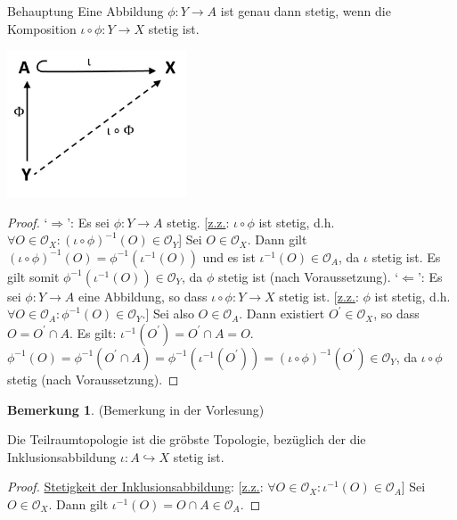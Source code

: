 \documentclass[a4paper,11pt,notitlepage]{report}
\theoremstyle{definition}
\newtheorem{remark}{Bemerkung}[chapter]
\newcommand{\OO}{{\ensuremath{\mathcal{O}}}}
\begin{document}
\begin{theorem}{Behauptung}
Eine Abbildung $\phi \colon Y \rightarrow A$ ist genau dann stetig, wenn die Komposition $\iota \circ \phi \colon Y \rightarrow X$ stetig ist.
\end{theorem}
\includegraphics[width=0.4\textwidth]{images/Universell_Diagramm.jpg}
\begin{proof}
`$\Rightarrow$': Es sei $\phi \colon Y \rightarrow A$ stetig. [\underline{z.z.}: $\iota \circ \phi$ ist stetig, d.h. $\forall O \in \OO_X \colon (\iota \circ \phi)^{-1}(O) \in \OO_Y$]
\newline
Sei $O \in \OO_X$. Dann gilt $(\iota \circ \phi)^{-1}(O) = \phi^{-1}\left(\iota^{-1}(O)\right)$ und es ist $\iota^{-1}(O) \in \OO_A$, da $\iota$ stetig ist.
\newline
Es gilt somit $\phi^{-1}\left(\iota^{-1}(O)\right) \in \OO_Y$, da $\phi$ stetig ist (nach Voraussetzung).
\newline
`$\Leftarrow$': Es sei $\phi \colon Y \rightarrow A$ eine Abbildung, so dass $\iota \circ \phi \colon Y \rightarrow X$ stetig ist. [\underline{z.z.}: $\phi$ ist stetig, d.h. $\forall O \in \OO_A \colon \phi^{-1}(O) \in \OO_Y$.]
\newline
Sei also $O \in \OO_A$. Dann existiert $O^\prime \in \OO_X$, so dass $O = O^\prime \cap A$.
Es gilt: $\iota^{-1}(O^\prime) = O^\prime \cap A = O$.
\newline
$\phi^{-1}(O) = \phi^{-1}(O^\prime \cap A) = \phi^{-1}\left(\iota^{-1}(O^\prime)\right) = (\iota \circ \phi)^{-1}(O^\prime) \in \OO_Y$, da $\iota \circ \phi$ stetig (nach Voraussetzung).
\end{proof}

\begin{remark}{(Bemerkung in der Vorlesung)}

Die Teilraumtopologie ist die gröbste Topologie, bezüglich der die Inklusionsabbildung $\iota \colon A \hookrightarrow X$ stetig ist.
\end{remark}

\begin{proof}
\underline{Stetigkeit der Inklusionsabbildung}: [\underline{z.z.}: $\forall O \in \OO_X \colon \iota^{-1}(O) \in \OO_A$]
\newline
Sei $O \in \OO_X$. Dann gilt $\iota^{-1}(O)=O \cap A \in \OO_A$.
\end{proof}
\end{document}
